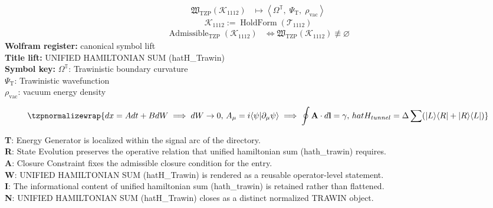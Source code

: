 \noindent
\begin{minipage}[t]{0.48\linewidth}
\begingroup
\small
\[
\begin{aligned}
\mathfrak{W}_{\mathrm{TZP}}\!\left(\mathcal{K}_{1112}\right)
&\longmapsto
\left\langle \Omega^{\mathbb{T}},\; \Psi_{\mathrm{T}},\; \rho_{\mathrm{vac}} \right\rangle
\end{aligned}
\]
\[
\mathcal{K}_{1112}
:=
\operatorname{HoldForm}\!\left(\mathcal{T}_{1112}\right)
\]
\[
\begin{aligned}
\operatorname{Admissible}_{\mathrm{TZP}}\!\left(\mathcal{K}_{1112}\right)
&\Longleftrightarrow
\mathfrak{W}_{\mathrm{TZP}}\!\left(\mathcal{K}_{1112}\right)\not\equiv\varnothing
\end{aligned}
\]
\textbf{Wolfram register:} canonical symbol lift\\
\textbf{Title lift:} UNIFIED HAMILTONIAN SUM (hatH\_Trawin)\\
\textbf{Symbol key:} \(\Omega^{\mathbb{T}}\): Trawinistic boundary curvature\\ \(\Psi_{\mathrm{T}}\): Trawinistic wavefunction\\ \(\rho_{\mathrm{vac}}\): vacuum energy density
\par
\endgroup
\end{minipage}\hfill
\begin{minipage}[t]{0.48\linewidth}
\[
\tzpnormalizewrap{dx = A dt + B dW \implies dW \to 0,\,A_\mu = i\langle \psi | \partial_\mu \psi \rangle \implies \oint \mathbf{A} \cdot d\mathbf{l} = \gamma,\,hat{H}_{tunnel} = \Delta \sum (|L\rangle \langle R| + |R\rangle \langle L|)}
\]

\small
\textbf{T}: Energy Generator is localized within the signal arc of the directory.\\
\textbf{R}: State Evolution preserves the operative relation that unified hamiltonian sum (hath\_trawin) requires.\\
\textbf{A}: Closure Constraint fixes the admissible closure condition for the entry.\\
\textbf{W}: UNIFIED HAMILTONIAN SUM (hatH\_Trawin) is rendered as a reusable operator-level statement.\\
\textbf{I}: The informational content of unified hamiltonian sum (hath\_trawin) is retained rather than flattened.\\
\textbf{N}: UNIFIED HAMILTONIAN SUM (hatH\_Trawin) closes as a distinct normalized TRAWIN object.
\normalsize
\end{minipage}


